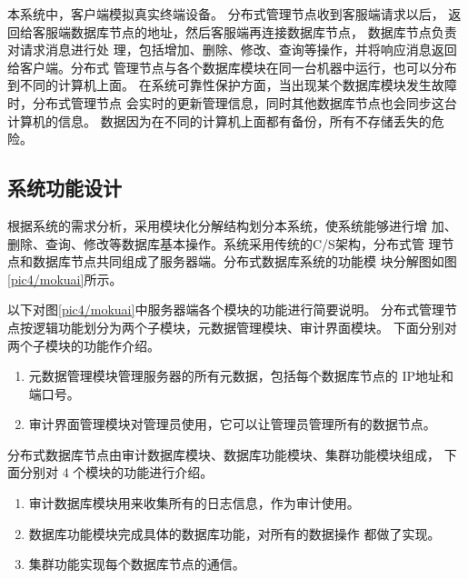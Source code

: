 本系统中，客户端模拟真实终端设备。
分布式管理节点收到客服端请求以后，
返回给客服端数据库节点的地址，然后客服端再连接数据库节点，
数据库节点负责对请求消息进行处
理，包括增加、删除、修改、查询等操作，并将响应消息返回给客户端。分布式
管理节点与各个数据库模块在同一台机器中运行，也可以分布到不同的计算机上面。
在系统可靠性保护方面，当出现某个数据库模块发生故障时，分布式管理节点
会实时的更新管理信息，同时其他数据库节点也会同步这台计算机的信息。
数据因为在不同的计算机上面都有备份，所有不存储丢失的危险。
\subsection{系统功能设计}
根据系统的需求分析，采用模块化分解结构划分本系统，使系统能够进行增
加、删除、查询、修改等数据库基本操作。系统采用传统的C/S架构，分布式管
理节点和数据库节点共同组成了服务器端。分布式数据库系统的功能模
块分解图如图\ref{pic4/mokuai}所示。

以下对图\ref{pic4/mokuai}中服务器端各个模块的功能进行简要说明。
分布式管理节点按逻辑功能划分为两个子模块，元数据管理模块、审计界面模块。
下面分别对两个子模块的功能作介绍。
\begin{enumerate}
	\item 元数据管理模块管理服务器的所有元数据，包括每个数据库节点的
	IP地址和端口号。
	\item 审计界面管理模块对管理员使用，它可以让管理员管理所有的数据节点。
\end{enumerate}

分布式数据库节点由审计数据库模块、数据库功能模块、集群功能模块组成，
 下面分别对 4 个模块的功能进行介绍。
 \begin{enumerate}
 	\item 审计数据库模块用来收集所有的日志信息，作为审计使用。
 	\item 数据库功能模块完成具体的数据库功能，对所有的数据操作
 	都做了实现。
 	\item 集群功能实现每个数据库节点的通信。
 \end{enumerate}
